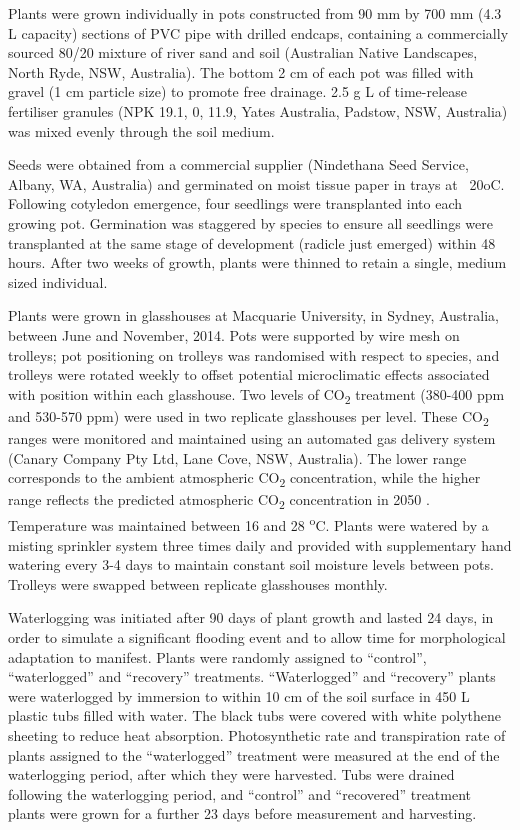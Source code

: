 \documentclass[openright,12pt,a4paper]{memoir}
\begin{document}
Plants were grown individually in pots constructed from 90 mm by 700 mm (4.3 L capacity) sections of PVC pipe with drilled endcaps, containing a commercially sourced 80/20 mixture of river sand and soil (Australian Native Landscapes, North Ryde, NSW, Australia). The bottom 2 cm of each pot was filled with gravel (1 cm particle size) to promote free drainage. 2.5 g L of time-release fertiliser granules (NPK 19.1, 0, 11.9, Yates Australia, Padstow, NSW, Australia) was mixed evenly through the soil medium.

Seeds were obtained from a commercial supplier (Nindethana Seed Service, Albany, WA, Australia) and germinated on moist tissue paper in trays at ~20oC. Following cotyledon emergence, four seedlings were transplanted into each growing pot. Germination was staggered by species to ensure all seedlings were transplanted at the same stage of development (radicle just emerged) within 48 hours. After two weeks of growth, plants were thinned to retain a single, medium sized individual.

Plants were grown in glasshouses at Macquarie University, in Sydney, Australia, between June and November, 2014. Pots were supported by wire mesh on trolleys; pot positioning on trolleys was randomised with respect to species, and trolleys were rotated weekly to offset potential microclimatic effects associated with position within each glasshouse. Two levels of CO\textsubscript{2} treatment (380-400 ppm and 530-570 ppm) were used in two replicate glasshouses per level. These CO\textsubscript{2} ranges were monitored and maintained using an automated gas delivery system (Canary Company Pty Ltd, Lane Cove, NSW, Australia). The lower range corresponds to the ambient atmospheric CO\textsubscript{2} concentration, while the higher range reflects the predicted atmospheric CO\textsubscript{2} concentration in 2050 \citep{IPCC2014}. Temperature was maintained between 16 and 28 \textsuperscript{o}C. Plants were watered by a misting sprinkler system three times daily and provided with supplementary hand watering every 3-4 days to maintain constant soil moisture levels between pots. Trolleys were swapped between replicate glasshouses monthly.

Waterlogging was initiated after 90 days of plant growth and lasted 24 days, in order to simulate a significant flooding event and to allow time for morphological adaptation to manifest. Plants were randomly assigned to “control”, “waterlogged” and “recovery” treatments. “Waterlogged” and “recovery” plants were waterlogged by immersion to within 10 cm of the soil surface in 450 L plastic tubs filled with water. The black tubs were covered with white polythene sheeting to reduce heat absorption. Photosynthetic rate and transpiration rate of plants assigned to the “waterlogged” treatment were measured at the end of the waterlogging period, after which they were harvested. Tubs were drained following the waterlogging period, and “control” and “recovered” treatment plants were grown for a further 23 days before measurement and harvesting.
\end{document}
